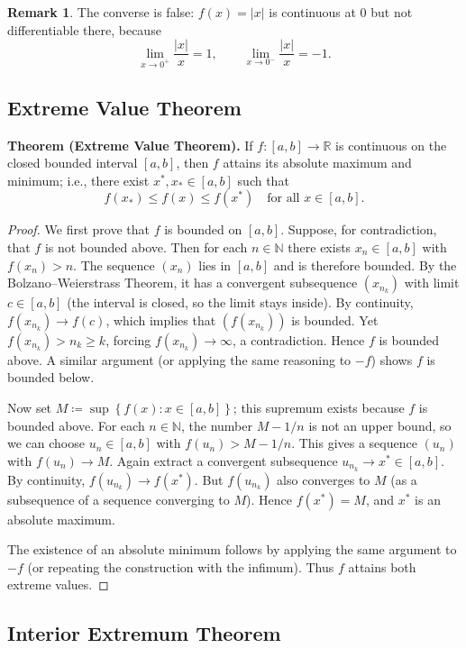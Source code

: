\documentclass[12pt,a4paper]{article}
\theoremstyle{definition}
\newtheorem*{remark}{Remark}
\newcommand{\R}{\mathbb{R}}
\newcommand{\N}{\mathbb{N}}
\newcommand{\abs}[1]{\left\lvert#1\right\rvert}
\newcommand{\set}[1]{\left\{#1\right\}}
\begin{document}
\begin{remark}
The converse is false: \(f(x)=\abs{x}\) is continuous at \(0\) but not differentiable there, because
\[
\lim_{x\to0^+}\frac{\abs{x}}{x}=1,\qquad \lim_{x\to0^-}\frac{\abs{x}}{x}=-1.
\]
\end{remark}

\subsection{Extreme Value Theorem}

\textbf{Theorem (Extreme Value Theorem).} If \(f:[a,b]\to\R\) is continuous on the closed bounded interval \([a,b]\), then \(f\) attains its absolute maximum and minimum; i.e., there exist \(x^*,x_*\in[a,b]\) such that
\[
f(x_*)\le f(x)\le f(x^*) \quad\text{for all } x\in[a,b].
\]

\begin{proof}
We first prove that \(f\) is bounded on \([a,b]\). Suppose, for contradiction, that \(f\) is not bounded above. Then for each \(n\in\N\) there exists \(x_n\in[a,b]\) with \(f(x_n)>n\). The sequence \((x_n)\) lies in \([a,b]\) and is therefore bounded. By the Bolzano–Weierstrass Theorem, it has a convergent subsequence \((x_{n_k})\) with limit \(c\in[a,b]\) (the interval is closed, so the limit stays inside). By continuity, \(f(x_{n_k})\to f(c)\), which implies that \((f(x_{n_k}))\) is bounded. Yet \(f(x_{n_k})>n_k\ge k\), forcing \(f(x_{n_k})\to\infty\), a contradiction. Hence \(f\) is bounded above. A similar argument (or applying the same reasoning to \(-f\)) shows \(f\) is bounded below.

Now set \(M\coloneqq\sup\set{f(x):x\in[a,b]}\); this supremum exists because \(f\) is bounded above. For each \(n\in\N\), the number \(M-1/n\) is not an upper bound, so we can choose \(u_n\in[a,b]\) with \(f(u_n)>M-1/n\). This gives a sequence \((u_n)\) with \(f(u_n)\to M\). Again extract a convergent subsequence \(u_{n_k}\to x^*\in[a,b]\). By continuity, \(f(u_{n_k})\to f(x^*)\). But \(f(u_{n_k})\) also converges to \(M\) (as a subsequence of a sequence converging to \(M\)). Hence \(f(x^*)=M\), and \(x^*\) is an absolute maximum.

The existence of an absolute minimum follows by applying the same argument to \(-f\) (or repeating the construction with the infimum). Thus \(f\) attains both extreme values.
\end{proof}

\subsection{Interior Extremum Theorem}
\end{document}

